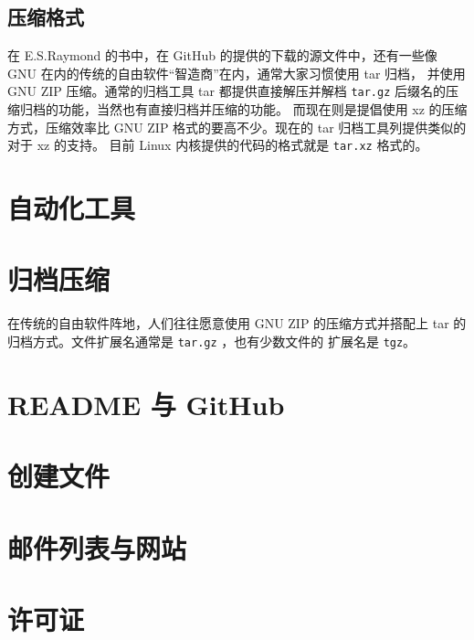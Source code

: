 \documentclass{ctexart}
\begin{document}
\subsection{压缩格式}
在 E.S.Raymond 的书中，在 GitHub 的提供的下载的源文件中，还有一些像 GNU 在内的传统的自由软件“智造商”在内，通常大家习惯使用 tar 归档，
并使用 GNU ZIP 压缩。通常的归档工具 tar 都提供直接解压并解档 \verb|tar.gz| 后缀名的压缩归档的功能，当然也有直接归档并压缩的功能。
而现在则是提倡使用 xz 的压缩方式，压缩效率比 GNU ZIP 格式的要高不少。现在的 tar 归档工具列提供类似的对于 xz 的支持。
目前 Linux 内核提供的代码的格式就是 \verb|tar.xz| 格式的。

\section{自动化工具}



\section{归档压缩}
在传统的自由软件阵地，人们往往愿意使用 GNU ZIP 的压缩方式并搭配上 tar 的归档方式。文件扩展名通常是 \verb|tar.gz| ，也有少数文件的
扩展名是 \verb|tgz|。

\section{README 与 GitHub}

\section{创建文件}

\section{邮件列表与网站}

\section{许可证}
\end{document}
